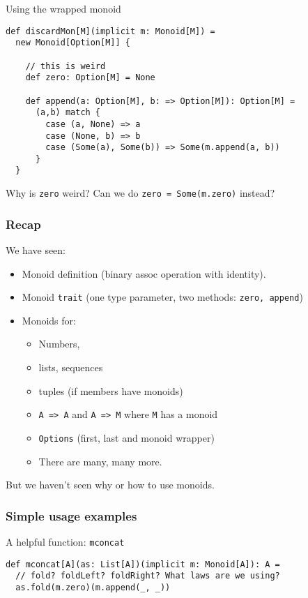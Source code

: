 \documentclass{beamer}
\begin{document}
\begin{framej}
\begin{frame}[fragile]
  \begin{block}{Using the wrapped monoid}
  \begin{lstlisting}
def discardMon[M](implicit m: Monoid[M]) =
  new Monoid[Option[M]] {

    // this is weird
    def zero: Option[M] = None

    def append(a: Option[M], b: => Option[M]): Option[M] =
      (a,b) match {
        case (a, None) => a
        case (None, b) => b
        case (Some(a), Some(b)) => Some(m.append(a, b))
      }
  }
  \end{lstlisting}
  \end{block}

  Why is \texttt{zero} weird?
  \pause
  Can we do \texttt{zero = Some(m.zero)} instead?
\end{frame}

\begin{frame}
  \frametitle{Recap}
  We have seen:
  \begin{itemize}
    \item Monoid definition (binary assoc operation with identity).
    \item Monoid \texttt{trait} (one type parameter,
      two methods: \texttt{zero, append})
    \item Monoids for:
      \begin{itemize}
      \item Numbers,
      \item lists, sequences
      \item tuples (if members have monoids)
      \item \texttt{A => A} and \texttt{A => M} where \texttt{M} has a monoid
      \item \texttt{Options} (first, last and monoid wrapper)
      \item There are many, many more.
      \end{itemize}
  \end{itemize}

  \begin{block}{}
    \centering
    But we haven't seen \alert{why} or \alert{how} to use monoids.
  \end{block}
\end{frame}

\begin{frame}[fragile]
  \frametitle{Simple usage examples}

  \begin{block}{A helpful function: \texttt{mconcat}}
  \begin{lstlisting}
def mconcat[A](as: List[A])(implicit m: Monoid[A]): A =
  // fold? foldLeft? foldRight? What laws are we using?
  as.fold(m.zero)(m.append(_, _))


\end{lstlisting}
\end{block}
\end{frame}
\end{framej}
\end{document}
